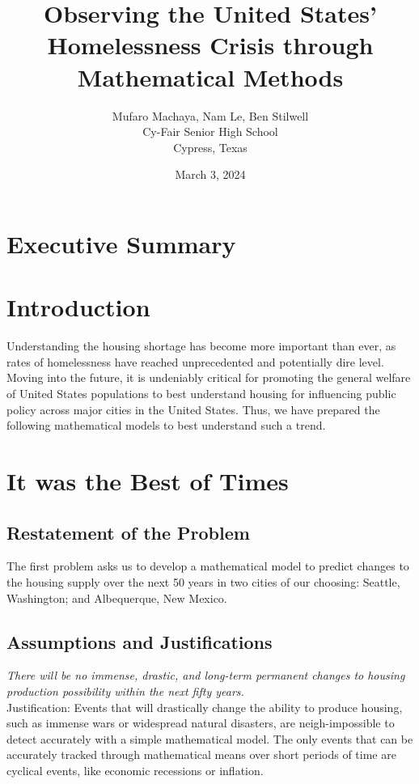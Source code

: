 \documentclass[12pt]{article}
\title{Observing the United States' Homelessness Crisis through Mathematical Methods}
\author{Mufaro Machaya, Nam Le, Ben Stilwell \\ Cy-Fair Senior High School \\ Cypress, Texas}
\date{March 3, 2024}
\begin{document}
\newpage

\section*{Executive Summary}
\blindtext

\maketitle
\newpage
\tableofcontents

\newpage

\section{Introduction}
Understanding the housing shortage has become more important than ever, as rates of homelessness have reached
unprecedented and potentially dire level\cite{NPR-ABGC-2022}. Moving into the future, it is
undeniably critical for promoting the general welfare of United States populations to best understand housing for
influencing public policy across major cities in the United States. Thus, we have prepared the following mathematical
models to best understand such a trend.

\newpage

\section{It was the Best of Times}

\subsection{Restatement of the Problem}
The first problem asks us to develop a mathematical model to predict changes to the housing supply over the next 50
years in two cities of our choosing: Seattle, Washington; and Albequerque, New Mexico.

\subsection{Assumptions and Justifications}

\textit{There will be no immense, drastic, and long-term permanent changes to housing production possibility
within the next fifty years.} \\

\noindent
Justification: Events that will drastically change the ability to produce housing, such as immense wars or widespread
natural disasters, are neigh-impossible to detect accurately with a simple mathematical model. The only events that can
be accurately tracked through mathematical means over short periods of time are cyclical events, like economic
recessions or inflation. \\
\end{document}
